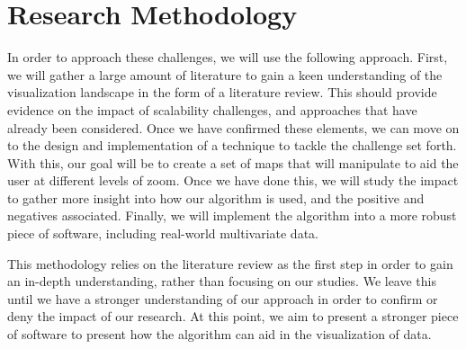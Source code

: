 \newpage
\section{Research Methodology}
In order to approach these challenges, we will use the following approach. First, we will gather a large amount of literature to gain a keen understanding of the visualization landscape in the form of a literature review. This should provide evidence on the impact of scalability challenges, and approaches that have already been considered. Once we have confirmed these elements, we can move on to the design and implementation of a technique to tackle the challenge set forth. With this, our goal will be to create a set of maps that will manipulate to aid the user at different levels of zoom. Once we have done this, we will study the impact to gather more insight into how our algorithm is used, and the positive and negatives associated. Finally, we will implement the algorithm into a more robust piece of software, including real-world multivariate data.

This methodology relies on the literature review as the first step in order to gain an in-depth understanding, rather than focusing on our studies. We leave this until we have a stronger understanding of our approach in order to confirm or deny the impact of our research. At this point, we aim to present a stronger piece of software to present how the algorithm can aid in the visualization of data.

